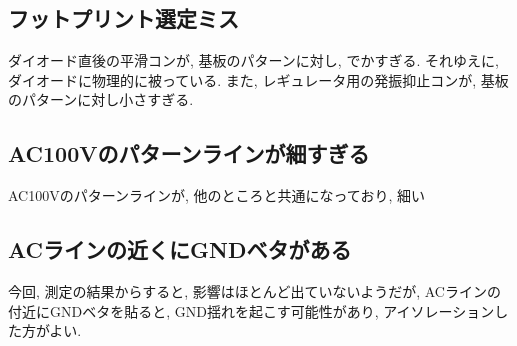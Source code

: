 \documentclass{jarticle}
\begin{document}
\subsection{フットプリント選定ミス}
ダイオード直後の平滑コンが, 基板のパターンに対し, でかすぎる. それゆえに, ダイオードに物理的に被っている. また, レギュレータ用の発振抑止コンが, 基板のパターンに対し小さすぎる.

\subsection{AC100Vのパターンラインが細すぎる}
AC100Vのパターンラインが, 他のところと共通になっており, 細い

\subsection{ACラインの近くにGNDベタがある}
今回, 測定の結果からすると, 影響はほとんど出ていないようだが, ACラインの付近にGNDベタを貼ると, GND揺れを起こす可能性があり, アイソレーションした方がよい.
\end{document}

